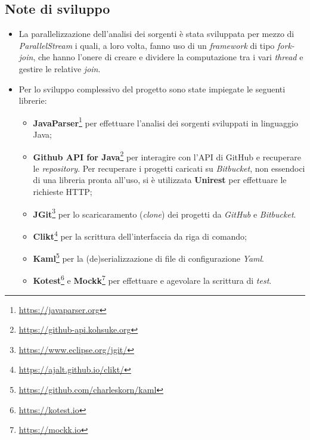 \subsection*{Note di sviluppo}
\begin{itemize}
	\item La parallelizzazione dell'analisi dei sorgenti è stata sviluppata per mezzo di \textit{ParallelStream} i quali, a loro volta, fanno uso di un \textit{framework} di tipo \textit{fork-join}, che hanno l'onere di creare e dividere la computazione tra i vari \textit{thread} e gestire le relative \textit{join}.
	\item Per lo sviluppo complessivo del progetto sono state impiegate le seguenti librerie:
	\begin{itemize}
		\item \textbf{JavaParser}\footnote{\url{https://javaparser.org}} per effettuare l'analisi dei sorgenti sviluppati in linguaggio Java;
		\item \textbf{Github API for Java}\footnote{\url{https://github-api.kohsuke.org}} per interagire con l'API di GitHub e recuperare le \textit{repository}. Per recuperare i progetti caricati su \textit{Bitbucket}, non essendoci di una libreria pronta all'uso, si è utilizzata \textbf{Unirest} per effettuare le richieste HTTP;
		\item \textbf{JGit}\footnote{\url{https://www.eclipse.org/jgit/}} per lo scaricaramento (\textit{clone}) dei progetti da \textit{GitHub} e \textit{Bitbucket}.
		\item \textbf{Clikt}\footnote{\url{https://ajalt.github.io/clikt/}} per la scrittura dell'interfaccia da riga di comando;
		\item \textbf{Kaml}\footnote{\url{https://github.com/charleskorn/kaml}} per la (de)serializzazione di file di configurazione \textit{Yaml}.
		\item \textbf{Kotest}\footnote{\url{https://kotest.io}} e \textbf{Mockk}\footnote{\url{https://mockk.io}} per effettuare e agevolare la scrittura di \textit{test}.
	\end{itemize}
\end{itemize}
